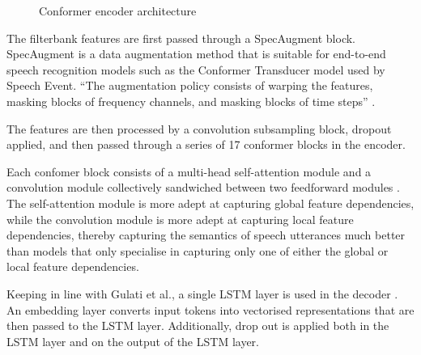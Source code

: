 \documentclass{CSSRforAfrica}
\newcounter{subsubsubsection}[subsubsection]
\begin{document}
\begin{figure}[thb]
\begin{center}
\end{center}
\caption{Conformer encoder architecture \cite{gulati_conformer_2020}}
\label{fig:conformer-encoder}
\end{figure}

The filterbank features are first passed through a SpecAugment block. SpecAugment is a data augmentation method that is suitable for end-to-end speech recognition models such as the Conformer Transducer model used by Speech Event. ``The augmentation policy consists of warping the features, masking blocks of frequency channels, and masking blocks of time steps'' \cite{park_specaugment_2019}.

The features are then processed by a convolution subsampling block, dropout applied, and then passed through a series of 17 conformer blocks in the encoder.

Each confomer block consists of a multi-head self-attention module and a convolution module collectively sandwiched between two feedforward modules \cite{gulati_conformer_2020}. The self-attention module is more adept at capturing global feature dependencies, while the convolution module is more adept at capturing local feature dependencies, thereby capturing the semantics of speech utterances much better than models that only specialise in capturing only one of either the global or local feature dependencies.

\newpage
{}
Keeping in line with Gulati et al., a single LSTM layer is used in the decoder \cite{gulati_conformer_2020}. An embedding layer converts input tokens into vectorised representations that are then passed to the LSTM layer. Additionally, drop out is applied both in the LSTM layer and on the output of the LSTM layer.
\end{document}

